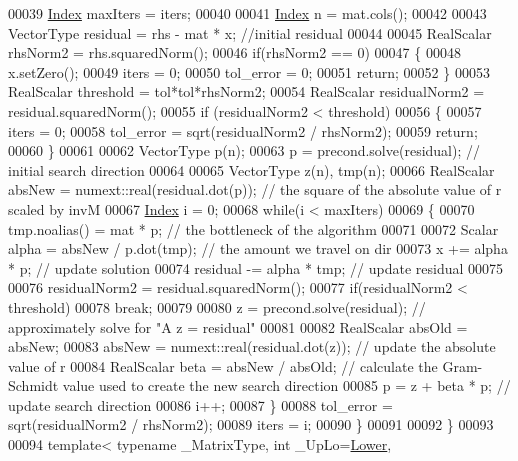 \begin{DoxyCode}
00039   \hyperlink{namespace_eigen_a62e77e0933482dafde8fe197d9a2cfde}{Index} maxIters = iters;
00040   
00041   \hyperlink{namespace_eigen_a62e77e0933482dafde8fe197d9a2cfde}{Index} n = mat.cols();
00042 
00043   VectorType residual = rhs - mat * x; \textcolor{comment}{//initial residual}
00044 
00045   RealScalar rhsNorm2 = rhs.squaredNorm();
00046   \textcolor{keywordflow}{if}(rhsNorm2 == 0) 
00047   \{
00048     x.setZero();
00049     iters = 0;
00050     tol\_error = 0;
00051     \textcolor{keywordflow}{return};
00052   \}
00053   RealScalar threshold = tol*tol*rhsNorm2;
00054   RealScalar residualNorm2 = residual.squaredNorm();
00055   \textcolor{keywordflow}{if} (residualNorm2 < threshold)
00056   \{
00057     iters = 0;
00058     tol\_error = sqrt(residualNorm2 / rhsNorm2);
00059     \textcolor{keywordflow}{return};
00060   \}
00061   
00062   VectorType p(n);
00063   p = precond.solve(residual);      \textcolor{comment}{// initial search direction}
00064 
00065   VectorType z(n), tmp(n);
00066   RealScalar absNew = numext::real(residual.dot(p));  \textcolor{comment}{// the square of the absolute value of r scaled by
       invM}
00067   \hyperlink{namespace_eigen_a62e77e0933482dafde8fe197d9a2cfde}{Index} i = 0;
00068   \textcolor{keywordflow}{while}(i < maxIters)
00069   \{
00070     tmp.noalias() = mat * p;                    \textcolor{comment}{// the bottleneck of the algorithm}
00071 
00072     Scalar alpha = absNew / p.dot(tmp);         \textcolor{comment}{// the amount we travel on dir}
00073     x += alpha * p;                             \textcolor{comment}{// update solution}
00074     residual -= alpha * tmp;                    \textcolor{comment}{// update residual}
00075     
00076     residualNorm2 = residual.squaredNorm();
00077     \textcolor{keywordflow}{if}(residualNorm2 < threshold)
00078       \textcolor{keywordflow}{break};
00079     
00080     z = precond.solve(residual);                \textcolor{comment}{// approximately solve for "A z = residual"}
00081 
00082     RealScalar absOld = absNew;
00083     absNew = numext::real(residual.dot(z));     \textcolor{comment}{// update the absolute value of r}
00084     RealScalar beta = absNew / absOld;          \textcolor{comment}{// calculate the Gram-Schmidt value used to create the new
       search direction}
00085     p = z + beta * p;                           \textcolor{comment}{// update search direction}
00086     i++;
00087   \}
00088   tol\_error = sqrt(residualNorm2 / rhsNorm2);
00089   iters = i;
00090 \}
00091 
00092 \}
00093 
00094 \textcolor{keyword}{template}< \textcolor{keyword}{typename} \_MatrixType, \textcolor{keywordtype}{int} \_UpLo=\hyperlink{group__enums_gga39e3366ff5554d731e7dc8bb642f83cda891792b8ed394f7607ab16dd716f60e6}{Lower},

\end{DoxyCode}

